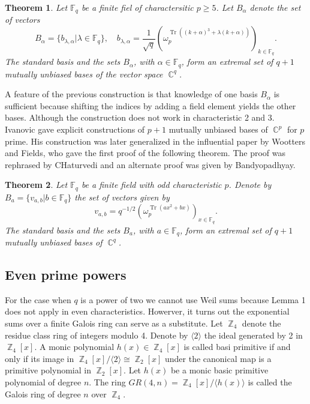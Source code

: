\documentclass[a4paper]{article}
\DeclareMathOperator{\C}{\mathbb{C}}
\DeclareMathOperator{\Z}{\mathbb{Z}}
\DeclareMathOperator{\Tr}{Tr}
\newtheorem{theorem}{Theorem}
\begin{document}
  \begin{theorem}
    Let $\mathbb F_q$ be a finite fiel of charactersitic $p
    \geq 5$. Let $B_\alpha$ denote the set of vectors
    \[
      B_\alpha
      = \{b_{\lambda,\alpha} | \lambda \in \mathbb F_q\},
      \quad 
      b_{\lambda,\alpha}
      = \frac{1}{\sqrt{q}} \left(
      \omega_p^{\Tr((k+\alpha)^3+\lambda(k+\alpha))}
      \right)_{k \in \mathbb F_q}.
    \] 
    The standard basis and the sets $B_\alpha$, with $\alpha
    \in \mathbb F_q$, form an extremal set of $q + 1$ 
    mutually unbiased bases of the vector space $\C^{q}$.
  \end{theorem}

  A feature of the previous construction is that knowledge
  of one basis $B_\alpha$ is sufficient because shifting the
  indices by adding a field element yields the other bases.
  Although the construction does not work in characteristic
  2 and 3. Ivanovic gave explicit constructions of $p + 1$ 
  mutually unbiased bases of $\C^{p}$ for $p$ prime. His
  construction was later generalized in the influential
  paper by Wootters and Fields, who gave the first proof of
  the following theorem. The proof was rephrased by
  CHaturvedi and an alternate proof was given by
  Bandyopadhyay.

  \begin{theorem}
    Let $\mathbb F_q$ be a finite field with odd
    characteristic $p$. Denote by $B_a = \{v_{a,b} | b \in
    \mathbb F_q\}$ the set of vectors given by
    \[
      v_{a,b} 
      = q^{-1/2} \left( \omega_p^{\Tr(ax^2+bx)} \right)_{x
        \in \mathbb F_q}.
    \] 
    The standard basis and the sets $B_a$, with $a \in
    \mathbb F_q$, form an extremal set of $q + 1$ mutually
    unbiased bases of $\C^{q}$.
  \end{theorem}

  \subsection{Even prime powers}

  For the case when $q$ is a power of two we cannot use Weil
  sums because Lemma 1 does not apply in even
  characteristics. Howerver, it turns out the exponential
  sums over a finite Galois ring can serve as a substitute.
  Let $\Z_4$ denote the residue class ring of integers
  modulo 4. Denote by $\langle 2 \rangle$ the ideal
  generated by 2 in $\Z_4[x]$. A monic polynomial $h(x) \in
  \Z_4[x]$ is called basi primitive if and only if its image
  in $\Z_4[x] / \langle 2 \rangle \cong \Z_2[x]$ under the
  canonical map is a primitive polynomial in $\Z_2[x]$. Let
  $h(x)$ be a monic basic primitive polynomial of degree
  $n$. The ring $GR(4,n) = \Z_4[x] / \langle h(x) \rangle$ 
  is called the Galois ring of degree $n$ over $\Z_4$.
\end{document}
